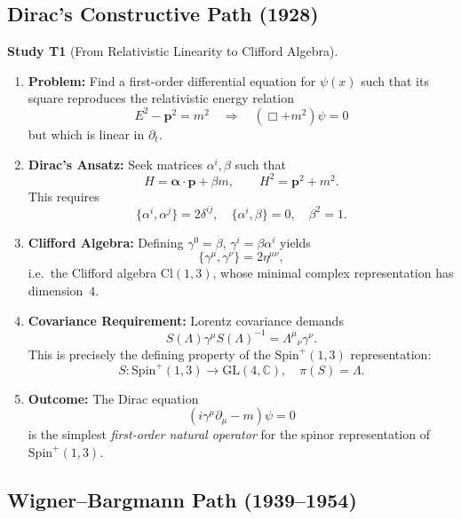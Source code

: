 \documentclass[10pt, letterpaper]{article}
\newcommand{\C}{\mathbb{C}}
\newcommand{\Cl}{\mathrm{Cl}}
\newcommand{\GL}{\mathrm{GL}}
\newcommand{\Spin}{\mathrm{Spin}}
\newcommand{\CustomHeading}[3]{%
  \par\medskip\noindent%
  \textbf{#1 #2} \textnormal{(#3)}.\enskip%
}
\newenvironment{STUD}[2]{\begin{unitbox}\CustomHeading{Study}{#1}{#2}}{\end{unitbox}}
\begin{document}
\subsection{Dirac’s Constructive Path (1928)}

\begin{STUD}{T1}{From Relativistic Linearity to Clifford Algebra}
\begin{enumerate}[label=\roman*)]
\item \textbf{Problem:} Find a first-order differential equation for $\psi(x)$ such that its square reproduces the relativistic energy relation
\[
E^2 - \mathbf{p}^2 = m^2 \quad \Rightarrow\quad (\Box + m^2)\psi = 0
\]
but which is linear in $\partial_t$.

\item \textbf{Dirac’s Ansatz:}
Seek matrices $\alpha^i,\beta$ such that
\[
H = \boldsymbol{\alpha}\cdot\mathbf{p} + \beta m,\qquad H^2 = \mathbf{p}^2 + m^2.
\]
This requires
\[
\{\alpha^i,\alpha^j\}=2\delta^{ij},\quad \{\alpha^i,\beta\}=0,\quad \beta^2=1.
\]

\item \textbf{Clifford Algebra:}
Defining $\gamma^0=\beta$, $\gamma^i=\beta\alpha^i$ yields
\[
\{\gamma^\mu,\gamma^\nu\}=2\eta^{\mu\nu},
\]
i.e.\ the Clifford algebra $\Cl(1,3)$, whose minimal complex representation has dimension~$4$.

\item \textbf{Covariance Requirement:}
Lorentz covariance demands
\[
S(\Lambda)\gamma^\mu S(\Lambda)^{-1} = \Lambda^\mu{}_\nu \gamma^\nu.
\]
This is precisely the defining property of the $\Spin^+(1,3)$ representation:
\[
S:\Spin^+(1,3)\to \GL(4,\C),\quad \pi(S)=\Lambda.
\]

\item \textbf{Outcome:}
The Dirac equation
\[
(i\gamma^\mu\partial_\mu - m)\psi=0
\]
is the simplest \emph{first-order natural operator} for the spinor representation of $\Spin^+(1,3)$.
\end{enumerate}
\end{STUD}

\subsection{Wigner–Bargmann Path (1939–1954)}
\end{document}
